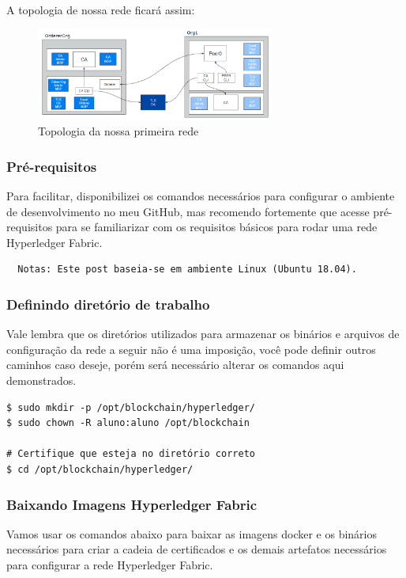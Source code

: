\documentclass[a4paper,11pt]{article}
\begin{document}
A topologia de nossa rede ficará assim:
\begin{figure}[H]
	\centering
	\includegraphics[width=0.7\textwidth]{imagens/primeira-rede.png}
	\caption{Topologia da nossa primeira rede}
\end{figure}

\subsubsection{Pré-requisitos}
Para facilitar, disponibilizei os comandos necessários para configurar o ambiente de desenvolvimento no meu GitHub\cite{configuracaodeambiente}, mas recomendo fortemente que acesse pré-requisitos\cite{prerequisitos} para se familiarizar com os requisitos básicos para rodar uma rede Hyperledger Fabric.

\begin{lstlisting}
  Notas: Este post baseia-se em ambiente Linux (Ubuntu 18.04).
\end{lstlisting}

\subsubsection{Definindo diretório de trabalho}
Vale lembra que os diretórios utilizados para armazenar os binários e arquivos de configuração da rede a seguir não é uma imposição, você pode definir outros caminhos caso deseje, porém será necessário alterar os comandos aqui demonstrados.

\begin{lstlisting}
$ sudo mkdir -p /opt/blockchain/hyperledger/
$ sudo chown -R aluno:aluno /opt/blockchain

# Certifique que esteja no diretório correto
$ cd /opt/blockchain/hyperledger/
\end{lstlisting}

\subsubsection{Baixando Imagens Hyperledger Fabric}
Vamos usar os comandos abaixo para baixar as imagens docker\cite{docker} e os binários necessários para criar a cadeia de certificados e os demais artefatos necessários para configurar a rede Hyperledger\cite{hyperledger} Fabric\cite{hyperledgerfabric}.
\end{document}
